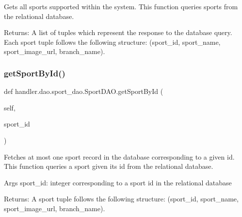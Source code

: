 \begin{DoxyVerb}Gets all sports supported within the system.
This function queries sports from the relational database.

Returns:
    A list of tuples which represent the response to the database query.
    Each sport tuple follows the following structure:
(sport_id, sport_name, sport_image_url, branch_name).
\end{DoxyVerb}
 \mbox{\label{classhandler_1_1dao_1_1sport__dao_1_1_sport_d_a_o_a5e661f49c07c8cbe8bad913645bd2890}} 
\subsubsection{\texorpdfstring{get\+Sport\+By\+Id()}{getSportById()}}
{\footnotesize\ttfamily def handler.\+dao.\+sport\+\_\+dao.\+Sport\+D\+A\+O.\+get\+Sport\+By\+Id (\begin{DoxyParamCaption}\item[{}]{self,  }\item[{}]{sport\+\_\+id }\end{DoxyParamCaption})}

\begin{DoxyVerb}Fetches at most one sport record in the database corresponding to a given id.
This function queries a sport given its id from the relational database.

Args
    sport_id: integer corresponding to a sport id in the relational database

Returns:
    A sport tuple follows the following structure:
(sport_id, sport_name, sport_image_url, branch_name).
\end{DoxyVerb}
 \mbox{\label{classhandler_1_1dao_1_1sport__dao_1_1_sport_d_a_o_a5952bf283f850965aeef34189c4c3cfa}} 
